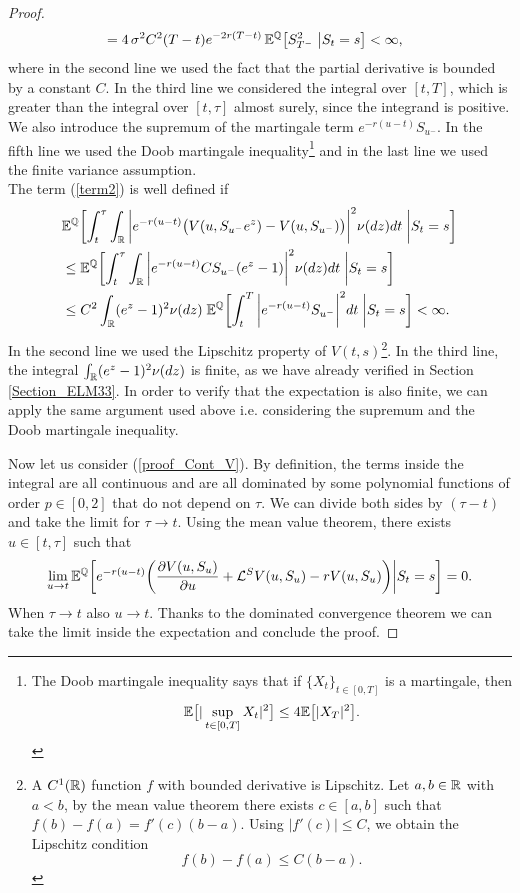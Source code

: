 \begin{proof}
\begin{align*}
& = 4 \, \sigma^2 C^2 (T-t) e^{-2r(T-t)}\, \mathbb{E}^{\mathbb{Q}} \bigl[  S_{T^-}^2  \; \big| S_t=s \bigr] < \infty,
 \end{align*}
 where in the second line we used the fact that the partial derivative is bounded by a constant $C$. 
 In the third line we considered the integral over $[t,T]$, which is greater than the integral over $[t,\tau]$ almost surely, since the integrand is positive. 
 We also introduce the supremum of the martingale term $e^{-r(u-t)} S_{u^-}$.  
 In the fifth line we used the Doob martingale inequality\footnote{ 
 The Doob martingale inequality says that if $\{X_t\}_{t\in[0,T]}$ is a martingale, then $$\mathbb{E} \bigl[ |\sup_{t\in [0,T]} X_t |^2 \bigr] 
 \leq 4 \mathbb{E}\bigl[ |X_T|^2 \bigr].$$} and in the last line we used the finite variance assumption.\\
 The term (\ref{term2}) is well defined if
 \begin{align*}
& \mathbb{E}^{\mathbb{Q}} \biggl[ \int_t^{\tau} \int_{\mathbb{R}} \bigg| e^{-r(u-t)} \bigl( V(u,S_{u^-}e^z) - V(u,S_{u^-}) \bigr) \bigg|^2 \nu(dz) dt \; \bigg| S_t=s \biggr]  \\
& \leq \mathbb{E}^{\mathbb{Q}} \biggl[ \int_t^{\tau} \int_{\mathbb{R}} \bigg| e^{-r(u-t)} C S_{u^-} (e^z-1) \bigg|^2 \nu(dz) dt \; \bigg| S_t=s \biggr]  \\
& \leq C^2 \int_{\mathbb{R}} (e^z-1)^2 \nu(dz) \; \mathbb{E}^{\mathbb{Q}} \biggl[ \int_t^{T} \bigg| e^{-r(u-t)} S_{u^-} \bigg|^2 dt \; \bigg| S_t=s \biggr] < \infty. 
\end{align*}
In the second line we used the Lipschitz property of $V(t,s)$\footnote{A $C^1(\mathbb{R})$ function $f$ with bounded derivative is Lipschitz. 
Let $a,b \in \mathbb{R}$ with $a<b$, by the mean value theorem there exists $c\in [a,b]$ such that $f(b)-f(a) = f'(c) (b-a)$. Using $|f'(c)|\leq C$, we obtain the Lipschitz condition
$$ f(b)-f(a) \leq C (b-a). $$}.
In the third line, the integral $\int_{\mathbb{R}} (e^z-1)^2 \nu(dz)$ is finite, as we have already verified in Section \ref{Section_ELM33}.
In order to verify that the expectation is also finite, we can apply the same argument used above i.e. considering the supremum and the Doob martingale inequality.
 
 Now let us consider (\ref{proof_Cont_V}).
 By definition, the terms inside the integral are all continuous and are all dominated by some polynomial functions of order $p\in[0,2]$ that do not depend on $\tau$.
 We can divide both sides by $(\tau-t)$ and take the limit for $\tau \to t$. Using the mean value theorem, there exists $u \in [t,\tau]$ such that 
 $$ \lim_{u \to t} \mathbb{E}^{\mathbb{Q}} \biggl[ e^{-r(u-t)} \biggl( \frac{\partial V(u,S_u)}{\partial u} + \mathcal{L}^{S} V(u,S_u) -r V(u,S_u) \biggr) \bigg| S_t=s \biggr] = 0. $$
 When $\tau\to t$ also $u\to t$. Thanks to the dominated convergence theorem we can take the limit inside the expectation and conclude the proof.
\end{proof}
